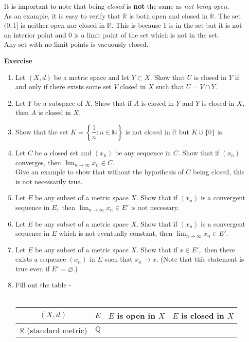 \documentclass{article}
\let\emptyset\varnothing
\newcounter{exercise}
\newcommand{\exercise}{\refstepcounter{exercise}\par\medskip
   {\textbf{Exercise \theexercise }} \rmfamily}
\begin{document}
	It is important to note that being \emph{closed} is \textbf{not} the same as \emph{not being open.}\\
	As an example, it is easy to verify that $\mathbb{R}$ is both open and closed in $\mathbb{R}.$ The set $(0, 1]$ is neither open nor closed in $\mathbb{R}.$ This is because $1$ is in the set but it is not an interior point and $0$ is a limit point of the set which is not in the set.\\
	Any set with no limit points is vacuously closed.\\
	\exercise
	\begin{enumerate}[nosep] 
		\item Let $(X, d)$ be a metric space and let $Y \subset X.$ Show that $U$ is closed in $Y$ if and only if there exists some set $V$ closed in $X$ such that $U = V \cap Y.$
		\item Let $Y$ be a subspace of $X.$ Show that if $A$ is closed in $Y$ and $Y$ is closed in $X,$ then $A$ is closed in $X.$
		\item Show that the set $K = \left\{\dfrac{1}{n} : n \in \mathbb{N}\right\}$ is not closed in $\mathbb{R}$ but $K \cup \{0\}$ is.
		\item Let $C$ be a closed set and $(x_n)$ be any sequence in $C.$ Show that if $(x_n)$ converges, then $\displaystyle\lim_{n\to \infty}x_n \in C.$\\
		Give an example to show that without the hypothesis of $C$ being closed, this is not necessarily true.
		\item Let $E$ be any subset of a metric space $X.$ Show that if $(x_n)$ is a convergent sequence in $E,$ then $\displaystyle\lim_{n\to \infty}x_n \in E'$ {\color{red} is not necessary}.
		\item Let $E$ be any subset of a metric space $X.$ Show that if $(x_n)$ is a convergent sequence in $E$ which is not eventually constant, then $\displaystyle\lim_{n\to \infty}x_n \in E'.$
		\item Let $E$ be any subset of a metric space $X.$ Show that if $x \in E',$ then there exists a sequence $(x_n)$ in $E$ such that $x_n \to x.$ (Note that this statement is true even if $E' = \emptyset.$)
		\item Fill out the table - \\~\\
		\begin{tabular}{|c|c|c|c|}
			\hline
			$(X, d)$ & $E$ & $E$ is open in $X$ & $E$ is closed in $X$\\
			\hline
			$\mathbb{R}$ (standard metric) & $\mathbb{Q}$ & & \\

\end{tabular}
\end{enumerate}
\end{document}
